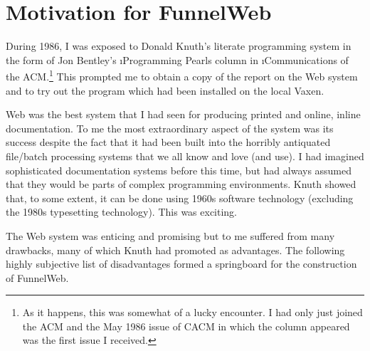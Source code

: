 \section{Motivation for FunnelWeb}

During 1986, I was exposed to Donald Knuth's
 literate
programming system in the
form of Jon Bentley's
\i{Programming  Pearls}
column in \i{Communications of
the ACM}\/.\footnote{As it happens, this was somewhat of a
lucky encounter. I had only just joined the ACM and
the May 1986 issue of CACM in which the column appeared was the first
issue I received.} This  prompted me to obtain  a copy of the
report on the Web system
and to try out the program which had been installed on the local Vaxen.

Web was  the best system that I had seen  for producing printed and
online, inline  documentation. To me
the most  extraordinary aspect of the  system was
its success despite the fact that it had been built into the horribly antiquated
file/batch processing systems that we all know  and love (and use). I had
imagined sophisticated documentation systems before this time, but had always
assumed that they would be parts of complex programming environments.
Knuth showed that, to some extent, it can be done using 1960s
software technology (excluding the 1980s typesetting technology).
This was exciting.

The Web  system was  enticing and promising  but to me suffered  from many
drawbacks, many of which Knuth had  promoted as advantages. The following highly
subjective list  of disadvantages formed  a springboard for the  construction of
FunnelWeb.


